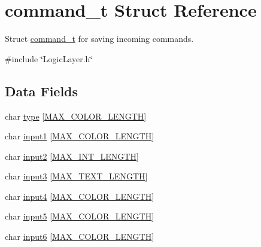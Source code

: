 \hypertarget{struct_l_l_1_1command__t}{}\section{command\+\_\+t Struct Reference}
\label{struct_l_l_1_1command__t}


Struct \mbox{\hyperlink{struct_l_l_1_1command__t}{command\+\_\+t}} for saving incoming commands.  




{\ttfamily \#include \char`\"{}Logic\+Layer.\+h\char`\"{}}

\subsection*{Data Fields}
\begin{DoxyCompactItemize}
\item 
char \mbox{\hyperlink{struct_l_l_1_1command__t_ad4885d875d90def63ae565800ef3a1f1}{type}} \mbox{[}\mbox{\hyperlink{group___global_ga9db5737c1a3aca5e334701167cae3e00}{M\+A\+X\+\_\+\+C\+O\+L\+O\+R\+\_\+\+L\+E\+N\+G\+TH}}\mbox{]}
\item 
char \mbox{\hyperlink{struct_l_l_1_1command__t_adde4065396e31487528868110c952672}{input1}} \mbox{[}\mbox{\hyperlink{group___global_ga9db5737c1a3aca5e334701167cae3e00}{M\+A\+X\+\_\+\+C\+O\+L\+O\+R\+\_\+\+L\+E\+N\+G\+TH}}\mbox{]}
\item 
char \mbox{\hyperlink{struct_l_l_1_1command__t_acfad2cb4ebf4d78e6bcb762a4e802e0c}{input2}} \mbox{[}\mbox{\hyperlink{group___global_ga641c7a7b2caa1f47c6663fdc497f226a}{M\+A\+X\+\_\+\+I\+N\+T\+\_\+\+L\+E\+N\+G\+TH}}\mbox{]}
\item 
char \mbox{\hyperlink{struct_l_l_1_1command__t_a0d3262af18e36d5f86a8871515a3403a}{input3}} \mbox{[}\mbox{\hyperlink{group___global_ga9a90baeac9b3273d185357200b599b39}{M\+A\+X\+\_\+\+T\+E\+X\+T\+\_\+\+L\+E\+N\+G\+TH}}\mbox{]}
\item 
char \mbox{\hyperlink{struct_l_l_1_1command__t_aa775e1d41b69141ea7d7072cf80128ff}{input4}} \mbox{[}\mbox{\hyperlink{group___global_ga9db5737c1a3aca5e334701167cae3e00}{M\+A\+X\+\_\+\+C\+O\+L\+O\+R\+\_\+\+L\+E\+N\+G\+TH}}\mbox{]}
\item 
char \mbox{\hyperlink{struct_l_l_1_1command__t_a5392f8cc032dbb16f447d2dcbf85e753}{input5}} \mbox{[}\mbox{\hyperlink{group___global_ga9db5737c1a3aca5e334701167cae3e00}{M\+A\+X\+\_\+\+C\+O\+L\+O\+R\+\_\+\+L\+E\+N\+G\+TH}}\mbox{]}
\item 
char \mbox{\hyperlink{struct_l_l_1_1command__t_a18d015c30e58eb834dcd71ad77069384}{input6}} \mbox{[}\mbox{\hyperlink{group___global_ga9db5737c1a3aca5e334701167cae3e00}{M\+A\+X\+\_\+\+C\+O\+L\+O\+R\+\_\+\+L\+E\+N\+G\+TH}}\mbox{]}

\end{DoxyCompactItemize}
